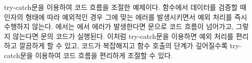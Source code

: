 \은 try-catch문을 이용하여 코드 흐름을 조절한 예제이다.  함수에서 데이터를 검증할 때 인자의 형태에 따라 예외적인 경우 그에 맞는 에러를 발생시키면서 예외 처리를 즉시 수행하지 않는다. 에서는 에서 에러가 발생한다면  문으로 코드 흐름이 넘어가고, 그렇지 않는다면  문의 코드가 실행된다. 이처럼 try-catch문을 이용하면 예외 처리를 편리하고 깔끔하게 할 수 있고, 코드가 복잡해지고 함수 호출의 단계가 깊어질수록 try-catch문을 이용하여 코드 흐름을 편리하게 조절할 수 있다.
